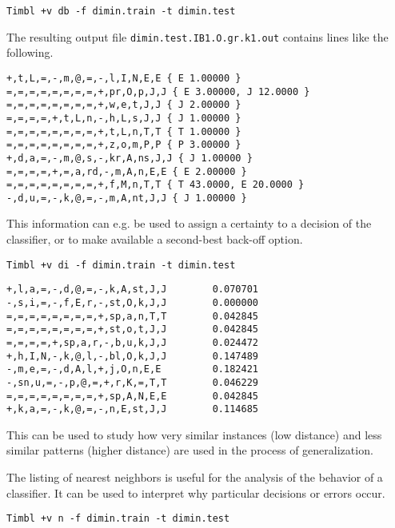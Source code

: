 \documentclass{report}
\begin{document}
{\small
\begin{verbatim}
Timbl +v db -f dimin.train -t dimin.test
\end{verbatim}
}

The resulting output file {\tt dimin.test.IB1.O.gr.k1.out} contains
lines like the following.

{\small
\begin{verbatim}
+,t,L,=,-,m,@,=,-,l,I,N,E,E { E 1.00000 }
=,=,=,=,=,=,=,=,+,pr,O,p,J,J { E 3.00000, J 12.0000 }
=,=,=,=,=,=,=,=,+,w,e,t,J,J { J 2.00000 }
=,=,=,=,+,t,L,n,-,h,L,s,J,J { J 1.00000 }
=,=,=,=,=,=,=,=,+,t,L,n,T,T { T 1.00000 }
=,=,=,=,=,=,=,=,+,z,o,m,P,P { P 3.00000 }
+,d,a,=,-,m,@,s,-,kr,A,ns,J,J { J 1.00000 }
=,=,=,=,+,=,a,rd,-,m,A,n,E,E { E 2.00000 }
=,=,=,=,=,=,=,=,+,f,M,n,T,T { T 43.0000, E 20.0000 }
-,d,u,=,-,k,@,=,-,m,A,nt,J,J { J 1.00000 }
\end{verbatim}
}

This information can e.g. be used to assign a certainty to a decision
of the classifier, or to make available a second-best back-off option.

{\small
\begin{verbatim}
Timbl +v di -f dimin.train -t dimin.test
\end{verbatim}
}

{\small
\begin{verbatim}
+,l,a,=,-,d,@,=,-,k,A,st,J,J        0.070701
-,s,i,=,-,f,E,r,-,st,O,k,J,J        0.000000
=,=,=,=,=,=,=,=,+,sp,a,n,T,T        0.042845
=,=,=,=,=,=,=,=,+,st,o,t,J,J        0.042845
=,=,=,=,+,sp,a,r,-,b,u,k,J,J        0.024472
+,h,I,N,-,k,@,l,-,bl,O,k,J,J        0.147489
-,m,e,=,-,d,A,l,+,j,O,n,E,E         0.182421
-,sn,u,=,-,p,@,=,+,r,K,=,T,T        0.046229
=,=,=,=,=,=,=,=,+,sp,A,N,E,E        0.042845
+,k,a,=,-,k,@,=,-,n,E,st,J,J        0.114685        
\end{verbatim}
}

This can be used to study how very similar instances (low distance) and
less similar patterns (higher distance) are used in the process of
generalization.

The listing of nearest neighbors is useful for the analysis of the
behavior of a classifier. It can be used to interpret why particular
decisions or errors occur.

{\small
\begin{verbatim}
Timbl +v n -f dimin.train -t dimin.test
\end{verbatim}
}
\end{document}

